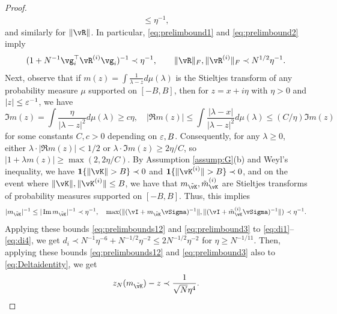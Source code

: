 \begin{proof}
\begin{align*}
\leq \eta^{-1},
\end{align*}
and similarly for $\|\vR\|$. In particular, \eqref{eq:prelimbound1} and
\eqref{eq:prelimbound2} imply
\begin{equation}\label{eq:prelimbounds12}
(1+N^{-1}\vg_i^\top \vR^{(i)}\vg_i)^{-1} \prec \eta^{-1},
\qquad \|\vR\|_F,\|\vR^{(i)}\|_F \prec N^{1/2}\eta^{-1}.
\end{equation}
Next, observe that if $m(z)=\int
\frac{1}{\lambda-z}d\mu(\lambda)$ is the Stieltjes transform of any probability
measure $\mu$ supported on $[-B,B]$, then for $z=x+i\eta$ with $\eta>0$ and
$|z| \leq \varepsilon^{-1}$, we have
\[\Im m(z)=\int \frac{\eta}{|\lambda-z|^2}d\mu(\lambda) \geq c\eta, \quad
|\Re m(z)| \leq \int \frac{|\lambda-x|}{|\lambda-z|^2}d\mu(\lambda)
\leq (C/\eta)\Im m(z)\]
for some constants $C,c>0$ depending on $\varepsilon,B$.
Consequently, for any $\lambda \geq 0$, either
$\lambda \cdot |\Re m(z)|<1/2$ or $\lambda \cdot \Im m(z) \geq 2\eta/C$,
so $|1+\lambda m(z)| \geq \max(2,2\eta/C)$. By Assumption \ref{assump:G}(b)
and Weyl's inequality, we have $\bI\{\|\vK\|>B\} \prec 0$ and
$\bI\{\|\vK^{(i)}\|>B\} \prec 0$, and on the event where $\|\vK\|,\|\vK^{(i)}\|
\leq B$, we have that $m_{\tilde \vK},\tilde m_{\vK}^{(i)}$ are Stieltjes
transforms of probability measures supported on $[-B,B]$. Thus, this implies
\begin{equation}\label{eq:prelimbound3}
|m_{\tilde \vK}|^{-1} \leq |\Im m_{\tilde \vK}|^{-1} \prec \eta^{-1},
\quad \max(\|(\vI+m_{\tilde \vK}\vSigma)^{-1}\|,
\|(\vI+\tilde m_{\vK}^{(i)}\vSigma)^{-1}\|) \prec \eta^{-1}.
\end{equation}
Applying these bounds \eqref{eq:prelimbounds12} and
\eqref{eq:prelimbound3} to \eqref{eq:di1}--\eqref{eq:di4},
we get $d_i \prec N^{-1}\eta^{-6}+N^{-1/2}\eta^{-2} \leq 2N^{-1/2}\eta^{-2}$ for
$\eta \geq N^{-1/11}$. Then, applying these bounds 
\eqref{eq:prelimbounds12} and \eqref{eq:prelimbound3} also to
\eqref{eq:Deltaidentity}, we get
\begin{equation}\label{eq:zNestimateprelim}
z_N(m_{\tilde \vK})-z \prec \frac{1}{\sqrt{N}\eta^4}.
\end{equation}


\end{proof}

